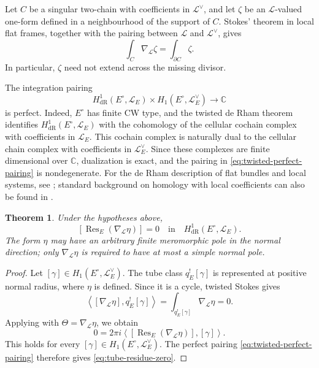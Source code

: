 \documentclass[12pt]{amsart}
\numberwithin{equation}{section}
\theoremstyle{plain}
\newtheorem{theorem}{Theorem}[section]
\theoremstyle{definition}
\theoremstyle{remark}
\theoremstyle{definition}
\DeclareMathOperator{\Res}{Res}
\newcommand{\C}{\mathbb C}
\newcommand{\Lcal}{\mathscr L}
\begin{document}
Let $C$ be a singular two-chain with coefficients in $\Lcal^\vee$, and let $\zeta$ be an $\Lcal$-valued one-form defined in a neighbourhood of the support of $C$. Stokes' theorem in local flat frames, together with the pairing between $\Lcal$ and $\Lcal^\vee$, gives
\begin{equation}\label{eq:twisted-stokes}
\int_C\nabla_{\Lcal}\zeta=\int_{\partial C}\zeta.
\end{equation}
In particular, $\zeta$ need not extend across the missing divisor.

The integration pairing
\begin{equation}\label{eq:twisted-perfect-pairing}
H^1_{\mathrm{dR}}(E^\circ,\Lcal_E)\times H_1(E^\circ,\Lcal_E^\vee)\to\C
\end{equation}
is perfect. Indeed, $E^\circ$ has finite CW type, and the twisted de Rham theorem identifies $H^1_{\mathrm{dR}}(E^\circ,\Lcal_E)$ with the cohomology of the cellular cochain complex with coefficients in $\Lcal_E$. This cochain complex is naturally dual to the cellular chain complex with coefficients in $\Lcal_E^\vee$. Since these complexes are finite dimensional over $\C$, dualization is exact, and the pairing in \eqref{eq:twisted-perfect-pairing} is nondegenerate. For the de Rham description of flat bundles and local systems, see \cite{Deligne1970}; standard background on homology with local coefficients can also be found in \cite[Chapter~VI]{Bredon1993}.

\begin{theorem}\label{thm:tube-residue-exactness}
Under the hypotheses above,
\begin{equation}\label{eq:tube-residue-zero}
\left[\Res_E(\nabla_{\Lcal}\eta)\right]=0\quad\text{in}\quad H^1_{\mathrm{dR}}(E^\circ,\Lcal_E).
\end{equation}
The form $\eta$ may have an arbitrary finite meromorphic pole in the normal direction; only $\nabla_{\Lcal}\eta$ is required to have at most a simple normal pole.
\end{theorem}

\begin{proof}
Let $[\gamma]\in H_1(E^\circ,\Lcal_E^\vee)$. The tube class $q_E^![\gamma]$ is represented at positive normal radius, where $\eta$ is defined. Since it is a cycle, twisted Stokes gives
\begin{equation*}
\left\langle[\nabla_{\Lcal}\eta],q_E^![\gamma]\right\rangle=\int_{q_E^![\gamma]}\nabla_{\Lcal}\eta=0.
\end{equation*}
Applying  with $\Theta=\nabla_{\Lcal}\eta$, we obtain
\begin{equation*}
0=2\pi i\left\langle\left[\Res_E(\nabla_{\Lcal}\eta)\right],[\gamma]\right\rangle.
\end{equation*}
This holds for every $[\gamma]\in H_1(E^\circ,\Lcal_E^\vee)$. The perfect pairing \eqref{eq:twisted-perfect-pairing} therefore gives \eqref{eq:tube-residue-zero}.
\end{proof}
\end{document}
